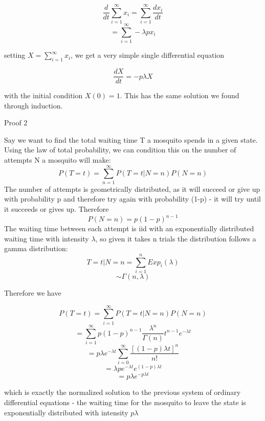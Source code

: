 \documentclass{article}
\begin{document}
$$\frac{d}{dt} \sum_{i=1}^{\infty} x_i = \sum_{i=1}^{\infty}\frac{d x_i}{dt}$$
$$ = \sum_{i=1}^{\infty}-\lambda p x_i$$

setting $X = \sum_{i=1}^{\infty}x_i$, we get a very simple single differential equation

$$\frac{dX}{dt} = - p \lambda X$$

with the initial condition $X(0) = 1$. This has the same solution we found through induction.

\begin{bf}
Proof 2
\end{bf}

Say we want to find the total waiting time T a mosquito spends in a given state.
Using the law of total probability, we can condition this on the number of attempts N
a mosquito will make:
$$P(T=t) = \sum_{n=1}^{\infty} P(T=t| N=n) P(N=n)$$
The number of attempts is geometrically distributed, as it will succeed or give up
with probability p and therefore try again with probability (1-p) - it will try until
it succeeds or gives up. Therefore
$$P(N=n) = p(1-p)^{n-1}$$
The waiting time between each attempt is iid with an exponentially distributed waiting
time with intensity $\lambda$, so given it takes n trials the distribution follows
a gamma distribution:
$$T=t|N=n = \sum_{i=1}^{n}Exp_i(\lambda)$$
$$ \sim \Gamma (n,\lambda)$$

Therefore we have

$$P(T=t) = \sum_{i=1}^{\infty}P(T=t|N=n)P(N=n)$$
$$ = \sum_{i=1}^{\infty}p(1-p)^{n-1}\frac{\lambda^n}{\Gamma (n)}t^{n-1} e^{-\lambda t}$$
$$ = p \lambda e^{-\lambda t} \sum_{i=0}^{\infty} \frac{[(1-p)\lambda t]^n}{n!}$$
$$ = \lambda p e^{-\lambda t} e^{(1-p)\lambda t}$$
$$ = p \lambda e^{-p \lambda t} $$

which is exactly the normalized solution to the previous system of ordinary differential
equations - the waiting time for the mosquito to leave the state is exponentially 
distributed with intensity $p \lambda$
\end{document}
